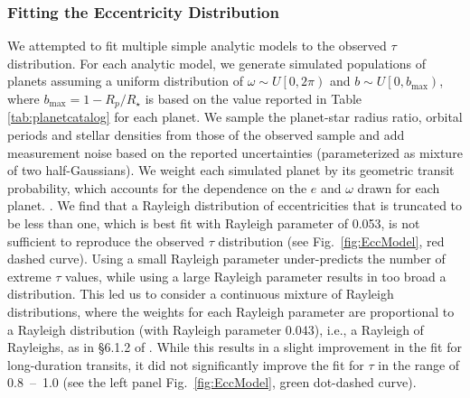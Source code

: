 \documentclass{aastex62}
\begin{document}
\subsubsection{Fitting the Eccentricity Distribution}
%
We attempted to fit multiple simple analytic models to the observed $\tau$ distribution.  
For each analytic model, we generate simulated populations of planets assuming a uniform distribution of $\omega\sim U\left[0,2\pi\right)$ and $b\sim U\left[0, b_{\max}\right)$, {where $b_{\max} =  1 - R_p/R_{\star}$ is based on the value reported in Table \ref{tab:planetcatalog} for each planet.}  
We sample the planet-star radius ratio, orbital periods and stellar densities from those of the observed sample and add measurement noise based on the reported uncertainties (parameterized as mixture of two half-Gaussians).  
We weight each simulated planet by its geometric transit probability, which accounts for the dependence on the $e$ and $\omega$ drawn for each planet.  {\citep[However, this does not account for how differences in transit duration affect the detection probability conditional on the planet transiting, as done in][]{He:2019,He:2020}.} 
We find that a Rayleigh distribution of eccentricities that is  truncated to be less than one, which is best fit with Rayleigh parameter of 0.053, is not sufficient to reproduce the observed $\tau$ distribution (see Fig.~\ref{fig:EccModel}, red dashed curve).  
Using a small Rayleigh parameter under-predicts the number of extreme $\tau$ values, while using a large Rayleigh parameter results in too broad a distribution.  
This led us to consider a continuous mixture of Rayleigh distributions, where the weights for each Rayleigh parameter are proportional to a Rayleigh distribution (with Rayleigh parameter 0.043), i.e., a Rayleigh of Rayleighs, as in \S6.1.2 of \cite{Lissauer:2011b}.  
While this results in a slight improvement in the fit for long-duration transits, it did not significantly improve the fit for $\tau$ in the range of 0.8~--~1.0 (see the left panel Fig.~\ref{fig:EccModel}, green dot-dashed curve). %
\end{document}
